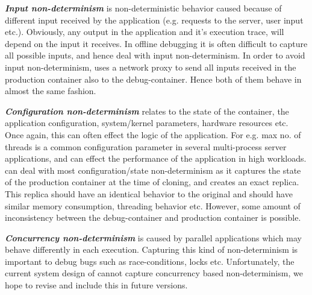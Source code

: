 \textbf{\textit{Input non-determinism}} is non-deterministic behavior caused because of different input received by the application (e.g. requests to the server, user input etc.). 
Obviously, any output in the application and it's execution trace, will depend on the input it receives. 
In offline debugging it is often difficult to capture all possible inputs, and hence deal with input non-determinism.
In order to avoid input non-determinism, \parikshan uses a network proxy to send all inputs received in the production container also to the debug-container. 
Hence both of them behave in almost the same fashion.

\textbf{\textit{Configuration non-determinism}} relates to the state of the container, the application configuration, system/kernel parameters, hardware resources etc.
Once again, this can often effect the logic of the application.
For e.g. max no. of threads is a common configuration parameter in several multi-process server applications, and can effect the performance of the application in high workloads.
\parikshan can deal with most configuration/state non-determinism as it captures the state of the production container at the time of cloning, and creates an exact replica.
This replica should have an identical behavior to the original and should have similar memory consumption, threading behavior etc. 
However, some amount of inconsistency between the debug-container and production container is possible.

\textbf{\textit{Concurrency non-determinism}} is caused by parallel applications which may behave differently in each execution.
Capturing this kind of non-determinism is important to debug bugs such as race-conditions, locks etc.
Unfortunately, the current system design of \parikshan cannot capture concurrency based non-determinism, we hope to revise and include this in future versions.


